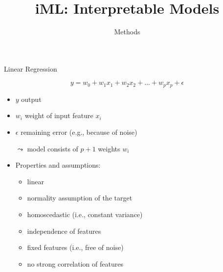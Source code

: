 \documentclass[aspectratio=169]{../latex_main/tntbeamer}  %
\title[Introduction]{iML: Interpretable Models}
\subtitle{Methods}
\begin{document}
	
	\maketitle


\begin{frame}[c]{Linear Regression}

    $$y = w_0 + w_1 x_1 + w_2 x_2 + \ldots + w_p x_p + \epsilon $$

    \begin{itemize}
        \item $y$ output
        \item $w_i$ weight of input feature $x_i$
        \item $\epsilon$ remaining error (e.g., because of noise)
        \item[$\leadsto$] model consists of $p+1$ weights $w_i$
        \item Properties and assumptions:
        \begin{itemize}
            \item linear
            \item normality assumption of the target
            \item homoscedastic (i.e., constant variance)
            \item independence of features
            \item fixed features (i.e., free of noise)
            \item no strong correlation of features
        \end{itemize} 
    \end{itemize}	

\end{frame}

\end{document}
